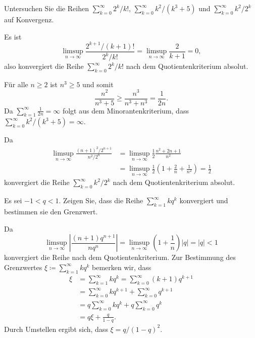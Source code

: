 \documentclass[a4paper,10pt]{article}
\begin{document}
\begin{question}
 Untersuchen Sie die Reihen $\sum_{k=0}^\infty 2^k/k!$, $\sum_{k=0}^\infty k^2/(k^3 + 5)$ und $\sum_{k=0}^\infty k^2/2^k$ auf Konvergenz.
\end{question}
\begin{solution}
 Es ist
 \[
  \limsup_{n \to \infty} \frac{2^{k+1} / (k+1)!}{2^k / k!}
  = \limsup_{n \to \infty}\frac{2}{k+1} = 0,
 \]
 also konvergiert die Reihe $\sum_{k=0}^\infty 2^k/k!$ nach dem Quotientenkriterium absolut.
 
 Für alle $n \geq 2$ ist $n^3 \geq 5$ und somit
 \[
  \frac{n^2}{n^3 + 5} \geq \frac{n^3}{n^3 + n^3} = \frac{1}{2n}.
 \]
 Da $\sum_{k=1}^\infty \frac{1}{2n} = \infty$ folgt aus dem Minorantenkriterium, dass $\sum_{k=0}^\infty k^2/(k^3 + 5) = \infty$.
 
 Da
 \begin{align*}
  \limsup_{n \to \infty} \frac{(n+1)^2/2^{n+1}}{n^2/2^n}
  &= \limsup_{n \to \infty} \frac{1}{2} \frac{n^2 + 2n + 1}{n^2} \\
  &= \limsup_{n \to \infty} \frac{1}{2} \left( 1 + \frac{2}{n} + \frac{1}{n^2} \right)
  = \frac{1}{2}
 \end{align*}
 konvergiert die Reihe $\sum_{k=0}^\infty k^2 / 2^k$ nach dem Quotientenkriterium absolut.
\end{solution}


\begin{question}
 Es sei $-1 < q < 1$. Zeigen Sie, dass die Reihe $\sum_{k=1}^\infty k q^k$ konvergiert und bestimmen sie den Grenzwert.
\end{question}
\begin{solution}
 Da
 \[
  \limsup_{n \to \infty} \left| \frac{(n+1)q^{n+1}}{nq^n} \right|
  = \limsup_{n \to \infty} \left(1 + \frac{1}{n}\right) |q|
  = |q|
  < 1
 \]
 konvergiert die Reihe nach dem Quotientenkriterium. Zur Bestimmung des Grenzwertes $\xi \coloneqq \sum_{k=1}^\infty k q^k$ bemerken wir, dass
 \begin{align*}
  \xi
  &= \sum_{k=1}^\infty k q^k
  = \sum_{k=0}^\infty (k+1) q^{k+1} \\
  &= \sum_{k=0}^\infty k q^{k+1} + \sum_{k=0}^\infty q^{k+1} \\
  &= q \sum_{k=0}^\infty k q^k + q \sum_{k=0}^\infty q^k \\
  &= q \xi + \frac{q}{1-q}.
 \end{align*}
 Durch Umstellen ergibt sich, dass $\xi = q/(1-q)^2$.
\end{solution}
\end{document}
